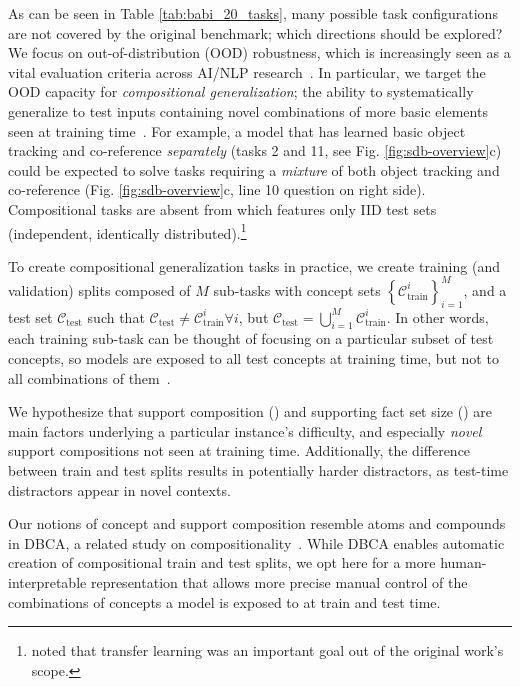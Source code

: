 As can be seen in Table \ref{tab:babi_20_tasks}, many possible task configurations are not covered by the original benchmark; which directions should be explored? We focus on out-of-distribution (OOD) robustness, which is increasingly seen as a vital evaluation criteria across AI/NLP research~\citep{shanahan2020artificial,hendrycks-etal-2020-pretrained}. In particular, we target the OOD capacity for \emph{compositional generalization}; the ability to systematically generalize to test inputs containing novel combinations of more basic elements seen at training time~\citep{partee1995lexical,lake2017building}. For example, a model that has learned basic object tracking and co-reference \emph{separately} (tasks 2 and 11, see Fig. \ref{fig:sdb-overview}c) could be expected to solve tasks requiring a \emph{mixture} of both object tracking and co-reference (Fig. \ref{fig:sdb-overview}c, line 10 question on right side). Compositional tasks are absent from \babibm which features only IID test sets (independent, identically distributed).\footnote{\citet{babi2016} noted that transfer learning was an important goal out of the original work's scope.} 


 To create compositional generalization tasks in practice, we create training (and validation) splits composed of $M$ sub-tasks with concept sets $\left\{ \mathcal{C}_{\text{train}}^{i}\right\} _{i=1}^{M}$, and a test set $\mathcal{C}_{\text{test}}$ such that $\mathcal{C}_{\text{test}}\neq\mathcal{C}_{\text{train}}^{i}\forall i$, but $\mathcal{C}_{\text{test}}=\bigcup_{i=1}^{M}\mathcal{C}_{\text{train}}^{i}$. In other words, each training sub-task can be thought of focusing on a particular subset of test concepts, so models are exposed to all test concepts at training time, but not to all combinations of them~\citep{yanaka-etal-2021-sygns}. 

 We hypothesize that support composition (\suppcomp) and supporting fact set size (\suppsize) are main factors underlying a particular instance's difficulty, and especially \emph{novel} support compositions not seen at training time. Additionally, the difference between train and test splits results in potentially harder distractors, as test-time distractors appear in novel contexts.

Our notions of concept and support composition resemble atoms and compounds in DBCA, a related study on compositionality~\citep{keysers2020measuring}. While DBCA enables automatic creation of compositional train and test splits, we opt here for a more human-interpretable representation that allows more precise manual control of the combinations of concepts a model is exposed to at train and test time.















